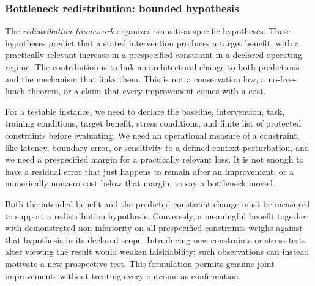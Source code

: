 \documentclass[5p,times,authoryear]{elsarticle}
\begin{document}
\subsubsection{Bottleneck redistribution: bounded hypothesis}
\label{subsubsec:redistribution}

The \emph{redistribution framework} organizes transition-specific hypotheses. These hypotheses predict that a stated intervention produces a target benefit, with a practically relevant increase in a prespecified constraint in a declared operating regime. The contribution is to link an architectural change to both predictions and the mechanism that links them. This is not a conservation law, a no-free-lunch theorem, or a claim that every improvement comes with a cost.

For a testable instance, we need to declare the baseline, intervention, task, training conditions, target benefit, stress conditions, and finite list of protected constraints before evaluating. We need an operational measure of a constraint, like latency, boundary error, or sensitivity to a defined context perturbation, and we need a prespecified margin for a practically relevant loss. It is not enough to have a residual error that just happens to remain after an improvement, or a numerically nonzero cost below that margin, to say a bottleneck moved.

Both the intended benefit and the predicted constraint change must be measured to support a redistribution hypothesis. Conversely, a meaningful benefit together with demonstrated non-inferiority on all prespecified constraints weighs against that hypothesis in its declared scope. Introducing new constraints or stress tests after viewing the result would weaken falsifiability; such observations can instead motivate a new prospective test. This formulation permits genuine joint improvements without treating every outcome as confirmation.
\end{document}

